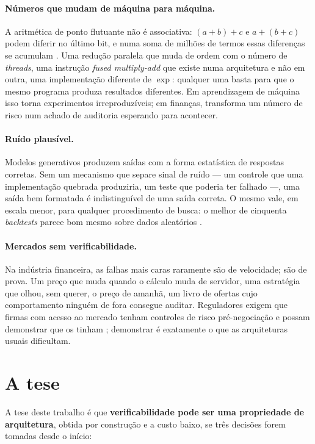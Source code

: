\paragraph{Números que mudam de máquina para máquina.} A aritmética de ponto flutuante não é associativa: $(a+b)+c$ e $a+(b+c)$ podem diferir no último bit, e numa soma de milhões de termos essas diferenças se acumulam \cite{goldberg1991,higham2002}. Uma redução paralela que muda de ordem com o número de \textit{threads}, uma instrução \textit{fused multiply-add} que existe numa arquitetura e não em outra, uma implementação diferente de $\exp$: qualquer uma basta para que o mesmo programa produza resultados diferentes. Em aprendizagem de máquina isso torna experimentos irreproduzíveis; em finanças, transforma um número de risco num achado de auditoria esperando para acontecer.

\paragraph{Ruído plausível.} Modelos generativos produzem saídas com a forma estatística de respostas corretas. Sem um mecanismo que separe sinal de ruído --- um controle que uma implementação quebrada produziria, um teste que poderia ter falhado ---, uma saída bem formatada é indistinguível de uma saída correta. O mesmo vale, em escala menor, para qualquer procedimento de busca: o melhor de cinquenta \textit{backtests} parece bom mesmo sobre dados aleatórios \cite{bailey2014dsr,harvey2016}.

\paragraph{Mercados sem verificabilidade.} Na indústria financeira, as falhas mais caras raramente são de velocidade; são de prova. Um preço que muda quando o cálculo muda de servidor, uma estratégia que olhou, sem querer, o preço de amanhã, um livro de ofertas cujo comportamento ninguém de fora consegue auditar. Reguladores exigem que firmas com acesso ao mercado tenham controles de risco pré-negociação e possam demonstrar que os tinham \cite{sec15c35,rts6}; demonstrar é exatamente o que as arquiteturas usuais dificultam.

\section{A tese}\label{sec:tese}

A tese deste trabalho é que \textbf{verificabilidade pode ser uma propriedade de arquitetura}, obtida por construção e a custo baixo, se três decisões forem tomadas desde o início:

